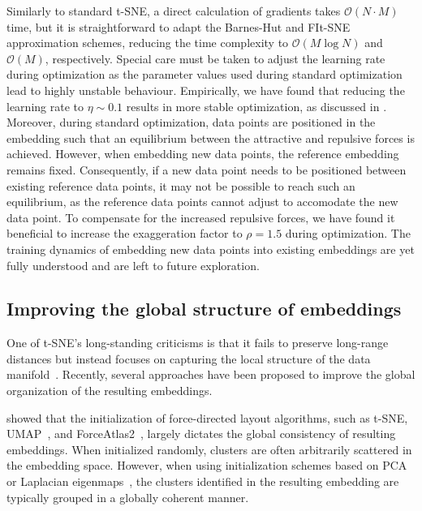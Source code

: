 \documentclass[article]{jss}
\begin{document}
Similarly to standard t-SNE, a direct calculation of gradients takes $\mathcal{O}(N \cdot M)$ time, but it is straightforward to adapt the Barnes-Hut and FIt-SNE approximation schemes, reducing the time complexity to $\mathcal{O}(M \log N)$ and $\mathcal{O}(M)$, respectively. Special care must be taken to adjust the learning rate during optimization as the parameter values used during standard optimization lead to highly unstable behaviour. Empirically, we have found that reducing the learning rate to $\eta \sim 0.1$ results in more stable optimization, as discussed in \citet{policar2021embedding}. Moreover, during standard optimization, data points are positioned in the embedding such that an equilibrium between the attractive and repulsive forces is achieved. However, when embedding new data points, the reference embedding remains fixed. Consequently, if a new data point needs to be positioned between existing reference data points, it may not be possible to reach such an equilibrium, as the reference data points cannot adjust to accomodate the new data point. To compensate for the increased repulsive forces, we have found it beneficial to increase the exaggeration factor to $\rho=1.5$ during optimization. The training dynamics of embedding new data points into existing embeddings are yet fully understood and are left to future exploration.


\subsection{Improving the global structure of embeddings} \label{sec:meth.global}

One of t-SNE's long-standing criticisms is that it fails to preserve long-range
distances but instead focuses on capturing the local structure of the data
manifold~\citep{becht2019dimensionality}. Recently, several approaches have been
proposed to improve the global organization of the resulting embeddings.

\citet{kobak2019umap} showed that the initialization of force-directed layout
algorithms, such as t-SNE, UMAP~\citep{2018arXivUMAP}, and
ForceAtlas2~\citep{jacomy2014forceatlas2}, largely dictates the global
consistency of resulting embeddings. When initialized randomly, clusters are
often arbitrarily scattered in the embedding space. However, when using
initialization schemes based on PCA or Laplacian eigenmaps~\citep{belkin2001laplacian}, the clusters identified in the resulting embedding are typically grouped in a globally
coherent manner.
\end{document}
